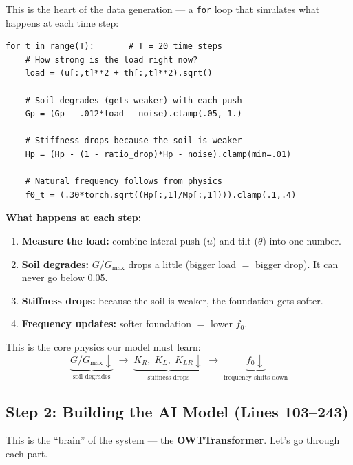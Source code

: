 \documentclass[11pt,a4paper]{article}
\begin{document}
This is the heart of the data generation --- a \texttt{for} loop that
simulates what happens at each time step:

\begin{lstlisting}
for t in range(T):       # T = 20 time steps
    # How strong is the load right now?
    load = (u[:,t]**2 + th[:,t]**2).sqrt()

    # Soil degrades (gets weaker) with each push
    Gp = (Gp - .012*load - noise).clamp(.05, 1.)

    # Stiffness drops because the soil is weaker
    Hp = (Hp - (1 - ratio_drop)*Hp - noise).clamp(min=.01)

    # Natural frequency follows from physics
    f0_t = (.30*torch.sqrt((Hp[:,1]/Mp[:,1]))).clamp(.1,.4)
\end{lstlisting}

\textbf{What happens at each step:}
\begin{enumerate}[nosep]
  \item \textbf{Measure the load:} combine lateral push ($u$) and
        tilt ($\theta$) into one number.
  \item \textbf{Soil degrades:} $G/G_{\max}$ drops a little
        (bigger load $=$ bigger drop).  It can never go below 0.05.
  \item \textbf{Stiffness drops:} because the soil is weaker, the
        foundation gets softer.
  \item \textbf{Frequency updates:} softer foundation $=$ lower $f_0$.
\end{enumerate}

\begin{physbox}
This is the core physics our model must learn:
\[
  \underbrace{G/G_{\max} \downarrow}_{\text{soil degrades}}
  \;\longrightarrow\;
  \underbrace{K_R,\; K_L,\; K_{LR} \downarrow}_{\text{stiffness drops}}
  \;\longrightarrow\;
  \underbrace{f_0 \downarrow}_{\text{frequency shifts down}}
\]
\end{physbox}


\subsection{Step 2: Building the AI Model (Lines 103--243)}

This is the ``brain'' of the system --- the \textbf{OWTTransformer}.
Let's go through each part.
\end{document}
